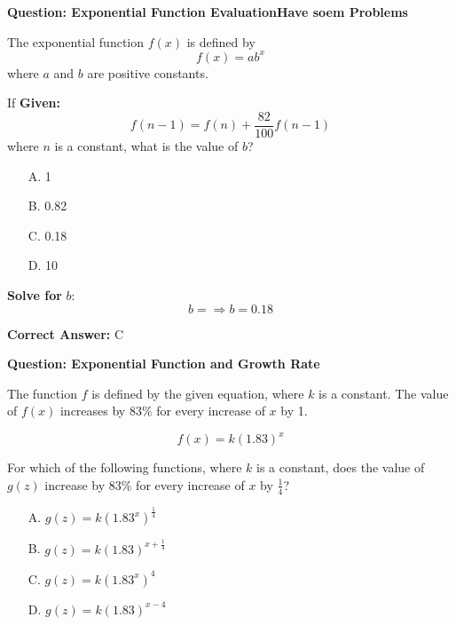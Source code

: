 \documentclass{beamer}
\begin{document}
\begin{frame}{\textbf{Question: Exponential Function Evaluation}\textbf{Have soem Problems
}}

The exponential function \( f(x) \) is defined by 
\[
f(x) = ab^x
\]
where \( a \) and \( b \) are positive constants.  

If 
\textbf{Given:}
\[
f(n - 1) = f(n) + \frac{82}{100} f(n - 1)
\]  
where \( n \) is a constant, what is the value of \( b \)?

\begin{itemize}
    \item[A.] 1
    \item[B.] 0.82
    \item[C.] 0.18
    \item[D.] 10
\end{itemize}

\end{frame}
\begin{frame}

\textbf{Solve for } \( b \):
\[
b =\Rightarrow b = 0.18
\]

\textbf{Correct Answer:} \( \boxed{\text{C}} \)

\end{frame}

\begin{frame}{\textbf{Question: Exponential Function and Growth Rate}}

The function \( f \) is defined by the given equation, where \( k \) is a constant.  
The value of \( f(x) \) increases by 83\% for every increase of \( x \) by 1.

\[
f(x) = k(1.83)^x
\]

For which of the following functions, where \( k \) is a constant, does the value of \( g(z) \) increase by 83\% for every increase of \( x \) by \( \frac{1}{4} \)?

\begin{itemize}
    \item[A.] \( g(z) = k(1.83^{x})^{\frac{1}{4}} \)
    \item[B.] \( g(z) = k(1.83)^{x+\frac{1}{4}} \)
    \item[C.] \( g(z) = k(1.83^x)^4 \)
    \item[D.] \( g(z) = k(1.83)^{x - 4} \)
\end{itemize}

\end{frame}
\end{document}
